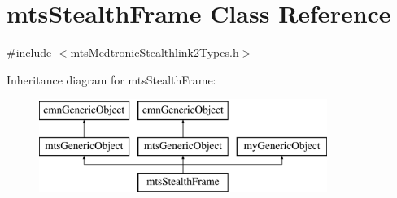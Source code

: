 \hypertarget{classmts_stealth_frame}{\section{mts\-Stealth\-Frame Class Reference}
\label{classmts_stealth_frame}
}


{\ttfamily \#include $<$mts\-Medtronic\-Stealthlink2\-Types.\-h$>$}

Inheritance diagram for mts\-Stealth\-Frame\-:\begin{figure}[H]
\begin{center}
\leavevmode
\includegraphics[height=3.000000cm]{da/dc7/classmts_stealth_frame}
\end{center}
\end{figure}
